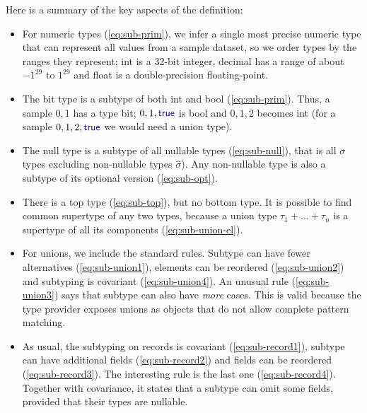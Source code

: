 \documentclass[preprint]{sigplanconf}
\newcommand{\kvd}[1]{\textnormal{\textcolor{kvdclr}{\sffamily #1}}}
\newcommand{\ident}[1]{\textnormal{\sffamily #1}}
\begin{document}

\noindent
Here is a summary of the key aspects of the definition:
\begin{itemize}
\item For numeric types (\ref{eq:sub-prim}), we infer a single most precise numeric type that 
  can represent all values from a sample dataset, so we order types by the ranges they represent;
  \ident{int} is a 32-bit integer, \ident{decimal} has a range of about $-1^{29}$ to $1^{29}$ and 
  \ident{float} is a double-precision floating-point.

\item The \ident{bit} type is a subtype of both \ident{int} and \ident{bool} (\ref{eq:sub-prim}). 
  Thus, a sample $0,1$ has a type \ident{bit}; $0,1,\kvd{true}$ is \ident{bool} and
  $0,1,2$ becomes \ident{int} (for a sample $0,1,2, \kvd{true}$ we would need a union type).

\item The \kvd{null} type is a subtype of all nullable types (\ref{eq:sub-null}), that is all 
  $\sigma$ types excluding non-nullable types $\hat{\sigma}$). Any non-nullable type is also a 
  subtype of its optional version (\ref{eq:sub-opt}).

\item There is a top type (\ref{eq:sub-top}), but no bottom type. It is possible to find common 
  supertype of any two types, because a union type $\tau_1 + \ldots + \tau_n$ is a supertype of all its 
  components (\ref{eq:sub-union-el}).

\item For unions, we include the standard rules. Subtype can have fewer alternatives 
  (\ref{eq:sub-union1}), elements can be reordered (\ref{eq:sub-union2}) and subtyping is covariant 
  (\ref{eq:sub-union4}). An unusual rule (\ref{eq:sub-union3}) says that subtype can also have 
  \emph{more} cases. This is valid because the type provider exposes unions as objects that do not
  allow complete pattern matching.

\item As usual, the subtyping on records is covariant (\ref{eq:sub-record1}), subtype can have additional 
  fields (\ref{eq:sub-record2}) and fields can  be reordered (\ref{eq:sub-record3}). The interesting rule 
  is the last one (\ref{eq:sub-record4}).  Together with covariance, it states that a subtype can omit some 
  fields, provided that their types are nullable.
\end{itemize}
\end{document}
